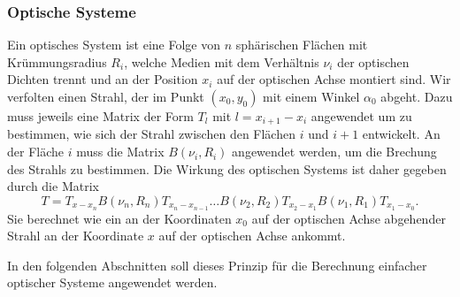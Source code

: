 \subsubsection{Optische Systeme}
Ein optisches System ist eine Folge von $n$ sphärischen Flächen mit
Krümmungsradius $R_i$, welche Medien mit dem Verhältnis $\nu_i$
der optischen Dichten trennt und an der Position $x_i$ auf der optischen
Achse montiert sind.
Wir verfolten einen Strahl, der im Punkt $(x_0,y_0)$ mit einem Winkel
$\alpha_0$ abgeht.
Dazu muss jeweils eine Matrix der Form $T_l$ mit $l={x_{i+1}-x_{i}}$
angewendet um zu bestimmen, wie sich der Strahl zwischen den Flächen
$i$ und $i+1$ entwickelt.
An der Fläche $i$ muss die Matrix $B(\nu_i,R_i)$ angewendet werden, um
die Brechung des Strahls zu bestimmen.
Die Wirkung des optischen Systems ist daher gegeben durch die Matrix
\[
T
=
T_{x-x_n}
B(\nu_n,R_n)
T_{x_n-x_{n-1}}
\dots
B(\nu_2,R_2)
T_{x_2-x_1}
B(\nu_1,R_1)
T_{x_1-x_0}.
\]
Sie berechnet wie ein an der Koordinaten $x_0$ auf der optischen Achse
abgehender Strahl an der Koordinate $x$ auf der optischen Achse
ankommt.

In den folgenden Abschnitten soll dieses Prinzip für die Berechnung
einfacher optischer Systeme angewendet werden.



